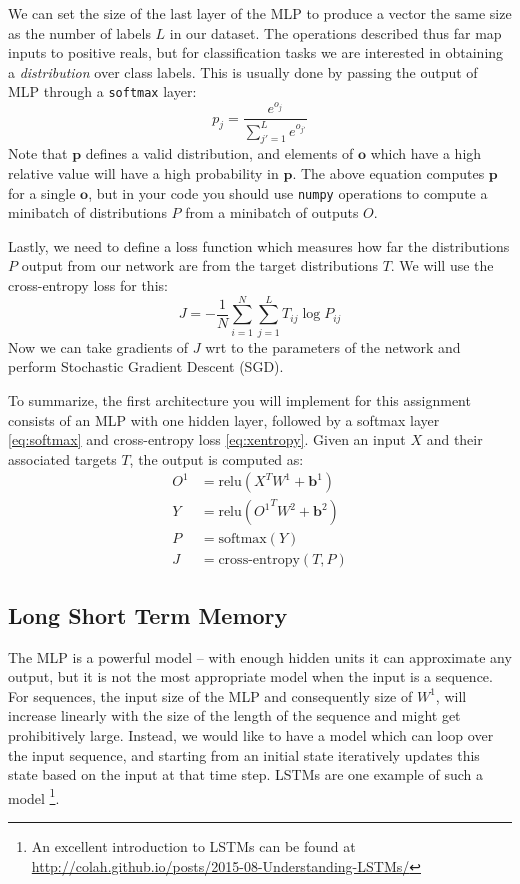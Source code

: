 \documentclass[12pt]{article}
\begin{document}
We can set the size of the last layer of the MLP to produce a vector the same size as the number of
labels $L$ in our dataset. The operations described thus far map inputs to positive reals, but for 
classification tasks we are interested 
in obtaining a \textit{distribution} over class labels. This is usually done by
passing the output of MLP through a \texttt{softmax} layer:
\begin{equation}
    \label{eq:softmax}
    p_j = \frac{e^{o_j}}{\sum_{j'=1}^L e^{o_{j'}}}
\end{equation}
Note that $\mathbf{p}$ defines a valid distribution, and elements of $\mathbf{o}$ which have a
high relative value will have a high probability in $\mathbf{p}$. The above equation computes
$\mathbf{p}$ for a single $\mathbf{o}$, but in your code you should use \texttt{numpy}
operations to compute a minibatch of distributions $P$ from a minibatch of outputs $O$.

Lastly, we need to define a loss function which measures how far the distributions $P$ output from our network are from 
the target distributions $T$. We will use the cross-entropy loss for this:
\begin{equation}
    \label{eq:xentropy}
    J = - \frac{1}{N} \sum_{i=1}^N \sum_{j=1}^L T_{ij} \log P_{ij}
\end{equation}
Now we can take gradients of $J$ wrt to the parameters of the network and perform
Stochastic Gradient Descent (SGD).

To summarize, the first architecture you will implement for this assignment consists of an MLP
with one hidden layer, followed by a softmax layer \ref{eq:softmax} and cross-entropy loss 
\ref{eq:xentropy}.
Given an input $X$ and their associated targets $T$, the output is computed as:
\begin{align*}
    O^1 &= \text{relu}(X^T W^1 + \mathbf{b}^1) \\
    Y &= \text{relu}({O^1}^T W^2 + \mathbf{b}^2) \\
    P &= \text{softmax}(Y) \\
    J &= \text{cross-entropy}(T,P)
\end{align*}

\subsection{Long Short Term Memory}
The MLP is a powerful model -- with enough hidden units it can approximate any output, but it is not the most appropriate
model when the input is a sequence. For sequences, the input size of the MLP and consequently size of $W^1$, will
increase linearly with the size of the length of the sequence and might get prohibitively large. Instead, we would 
like to have a model which can loop over the input sequence, and starting from an initial state iteratively 
updates this state based on the input at that time step. LSTMs are one example of such a model
\footnote{An excellent introduction to LSTMs can be found at \url{http://colah.github.io/posts/2015-08-Understanding-LSTMs/}}.
\end{document}
